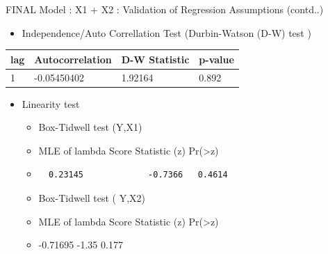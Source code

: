 \documentclass[
  ignorenonframetext,
]{beamer}
\providecommand{\tightlist}{%
  \setlength{\itemsep}{0pt}\setlength{\parskip}{0pt}}
\begin{document}
\begin{frame}[fragile]{FINAL Model : X1 + X2 : Validation of Regression
Assumptions (contd..)}
\protect\hypertarget{final-model-x1-x2-validation-of-regression-assumptions-contd..}{}
\begin{itemize}
\tightlist
\item
  Independence/Auto Correllation Test (Durbin-Watson (D-W) test )
\end{itemize}

\begin{longtable}[]{@{}llll@{}}
\toprule
lag & Autocorrelation & D-W Statistic & p-value \\
\midrule
\endhead
1 & -0.05450402 & 1.92164 & 0.892 \\
\bottomrule
\end{longtable}

\begin{itemize}
\tightlist
\item
  Linearity test

  \begin{itemize}
  \item
    Box-Tidwell test (Y,X1)
  \item
    MLE of lambda Score Statistic (z) Pr(\textgreater\textbar z\textbar)
  \item
\begin{verbatim}
  0.23145             -0.7366   0.4614
\end{verbatim}
  \item
    Box-Tidwell test ( Y,X2)
  \item
    MLE of lambda Score Statistic (z) Pr(\textgreater\textbar z\textbar)
  \item
    -0.71695 -1.35 0.177
  \end{itemize}
\end{itemize}
\end{frame}
\end{document}
